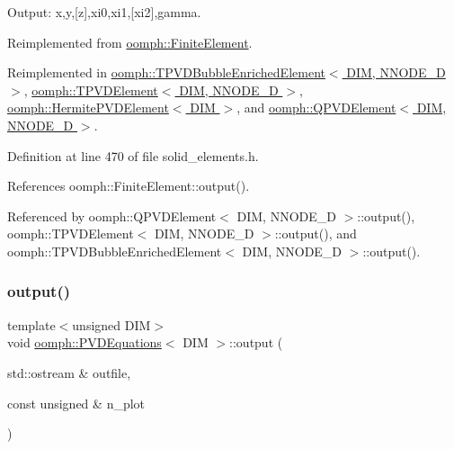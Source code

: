 Output\+: x,y,\mbox{[}z\mbox{]},xi0,xi1,\mbox{[}xi2\mbox{]},gamma. 



Reimplemented from \hyperlink{classoomph_1_1FiniteElement_a2ad98a3d2ef4999f1bef62c0ff13f2a7}{oomph\+::\+Finite\+Element}.



Reimplemented in \hyperlink{classoomph_1_1TPVDBubbleEnrichedElement_a4b2c44ad460959d1c3862eec3b879573}{oomph\+::\+T\+P\+V\+D\+Bubble\+Enriched\+Element$<$ D\+I\+M, N\+N\+O\+D\+E\+\_\+D $>$}, \hyperlink{classoomph_1_1TPVDElement_a048f0db11c13863fadc1606483c5a5e2}{oomph\+::\+T\+P\+V\+D\+Element$<$ D\+I\+M, N\+N\+O\+D\+E\+\_\+D $>$}, \hyperlink{classoomph_1_1HermitePVDElement_aa0e10a14a3b005e07d74c9fa99e47d48}{oomph\+::\+Hermite\+P\+V\+D\+Element$<$ D\+I\+M $>$}, and \hyperlink{classoomph_1_1QPVDElement_a038336073cf2e0ffb368e2c95feab324}{oomph\+::\+Q\+P\+V\+D\+Element$<$ D\+I\+M, N\+N\+O\+D\+E\+\_\+D $>$}.



Definition at line 470 of file solid\+\_\+elements.\+h.



References oomph\+::\+Finite\+Element\+::output().



Referenced by oomph\+::\+Q\+P\+V\+D\+Element$<$ D\+I\+M, N\+N\+O\+D\+E\+\_\+D $>$\+::output(), oomph\+::\+T\+P\+V\+D\+Element$<$ D\+I\+M, N\+N\+O\+D\+E\+\_\+D $>$\+::output(), and oomph\+::\+T\+P\+V\+D\+Bubble\+Enriched\+Element$<$ D\+I\+M, N\+N\+O\+D\+E\+\_\+D $>$\+::output().

\mbox{\label{classoomph_1_1PVDEquations_a5e3a09d059ced1ee9f9e1a7923171ab7}} 
\subsubsection{\texorpdfstring{output()}{output()}\hspace{0.1cm}{\footnotesize\ttfamily [2/4]}}
{\footnotesize\ttfamily template$<$unsigned D\+IM$>$ \\
void \hyperlink{classoomph_1_1PVDEquations}{oomph\+::\+P\+V\+D\+Equations}$<$ D\+IM $>$\+::output (\begin{DoxyParamCaption}\item[{std\+::ostream \&}]{outfile,  }\item[{const unsigned \&}]{n\+\_\+plot }\end{DoxyParamCaption})\hspace{0.3cm}{\ttfamily [virtual]}}




